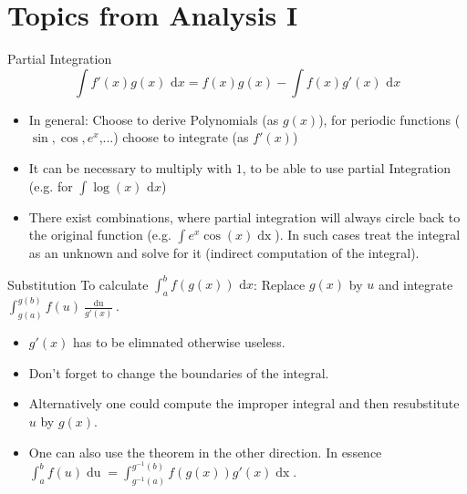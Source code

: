 \documentclass[a4paper,fontsize = 10pt]{article}
\def\dx{\text{ d}x}
\begin{document}
\section{Topics from Analysis I}
\begin{mainbox}{Partial Integration}
 $$\int f'(x) g(x) \dx = f(x)g(x) - \int f(x) g'(x) \dx$$
\end{mainbox}
\begin{itemize}
 \item In general: Choose to derive Polynomials (as $g(x)$), for periodic functions ($\sin, \cos, e^x$,...) choose to integrate (as $f'(x)$)
 \item It can be necessary to multiply with $1$, to be able to use partial Integration (e.g. for $\int \log(x) \dx$) 
 \item There exist combinations, where partial integration will always circle back to the original function (e.g. $\int e^x \cos(x)\mathop{dx}$). In such cases treat the integral as an unknown and solve for it (indirect computation of the integral).
\end{itemize}
\begin{mainbox}{Substitution}
 To calculate $\int_a^b f(g(x)) \dx$: Replace $g(x)$ by $u$ and integrate $\int_{g(a)}^{g(b)} f(u) \frac{\mathop{du}}{g'(x)}$.
\end{mainbox}
\begin{itemize}
 \item $g'(x)$ has to be elimnated otherwise useless.
 \item Don't forget to change the boundaries of the integral.
 \item Alternatively one could compute the improper integral and then resubstitute $u$ by $g(x)$.
 \item One can also use the theorem in the other direction. In essence $\int_a^b f(u) \mathop{du} = \int_{g^{-1}(a)}^{g^{-1}(b)}f(g(x))g'(x)\mathop{dx}$.
\end{itemize}
\end{document}
